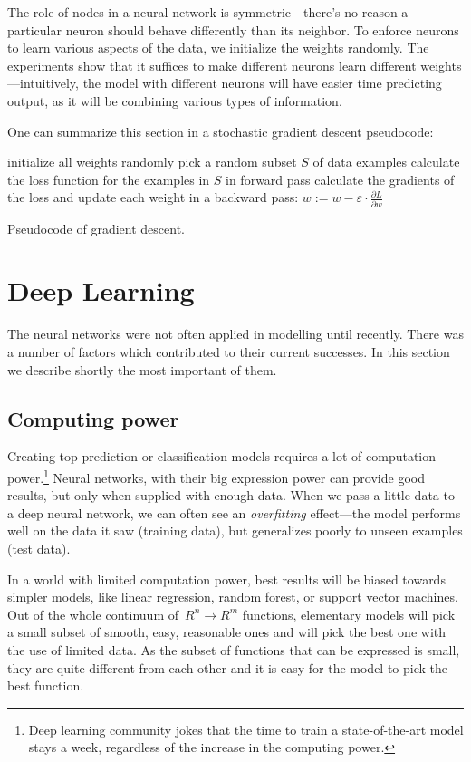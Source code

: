 The role of nodes in a neural network is symmetric---there's no reason a particular neuron should behave differently than its neighbor. To enforce neurons to learn various aspects of the data, we initialize the weights randomly. The experiments show that it suffices to make different neurons learn different weights---intuitively, the model with different neurons will have easier time predicting output, as it will be combining various types of information.

One can summarize this section in a stochastic gradient descent pseudocode:
\begin{algorithm} \label{sgd-pseudo}
  initialize all weights randomly\;
   {
    pick a random subset $S$ of data examples\;
    calculate the loss function for the examples in $S$ in forward pass\;
    calculate the gradients of the loss and update each weight in a backward pass:
    $w := w - \varepsilon \cdot \frac{\partial L}{\partial w}$
  }
  \caption{Pseudocode of gradient descent.}
\end{algorithm}

\section{Deep Learning}
The neural networks were not often applied in modelling until recently. There was a number of factors which contributed to their current successes. In this section we describe shortly the most important of them.

\subsection{Computing power}
Creating top prediction or classification models requires a lot of computation power.\footnote{Deep learning community jokes that the time to train a state-of-the-art model stays a week, regardless of the increase in the computing power.} Neural networks, with their big expression power can provide good results, but only when supplied with enough data. When we pass a little data to a deep neural network, we can often see an \emph{overfitting} effect---the model performs well on the data it saw (training data), but generalizes poorly to unseen examples (test data).

In a world with limited computation power, best results will be biased towards simpler models, like linear regression, random forest, or support vector machines. Out of the whole continuum of~$R^n \rightarrow R^m$ functions, elementary models will pick a small subset of smooth, easy, reasonable ones and will pick the best one with the use of limited data. As the subset of functions that can be expressed is small, they are quite different from each other and it is easy for the model to pick the best function.

